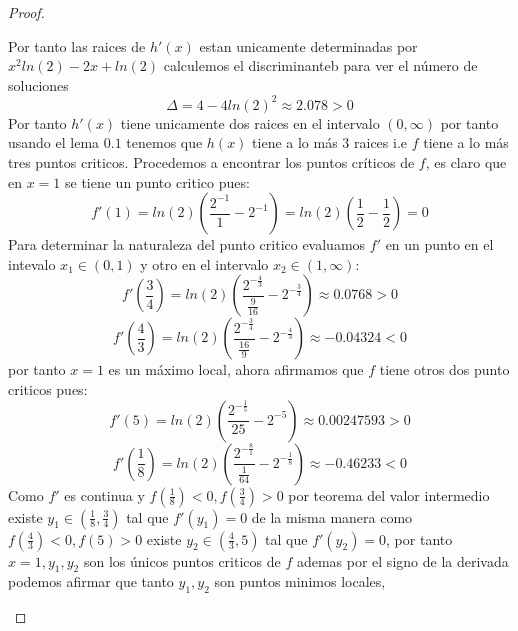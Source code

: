 \documentclass[11pt,letterpaper]{article}
\begin{document}
\begin{proof}
\begin{enumerate}
        Por tanto las raices de $h'(x)$ estan unicamente determinadas por $x^2ln(2)-2x+ln(2)$ calculemos el discriminanteb para ver el n\'umero de soluciones\,\\
        \begin{equation*}
            \Delta=4-4ln(2)^2\approx2.078>0
        \end{equation*}
        Por tanto $h'(x)$ tiene unicamente dos raices en el intervalo $(0,\infty)$ por tanto usando el lema $0.1$ tenemos que $h(x)$ tiene a lo m\'as $3$ raices i.e $f$ tiene a lo m\'as tres puntos criticos.
        Procedemos a encontrar los puntos cr\'iticos de $f$, es claro que en $x=1$ se tiene un punto critico pues:\,\\
        \begin{equation*}
            f'(1)=ln(2)\left(\frac{2^{-1}}{1}-2^{-1}\right)=ln(2)\left(\frac{1}{2}-\frac{1}{2}\right)=0
        \end{equation*}
        Para determinar la naturaleza del punto critico evaluamos $f'$ en un punto en el intevalo $x_1\in(0,1)$ y otro en el intervalo $x_2\in(1,\infty)$:\,\\
        \begin{equation*}
            f'\left(\frac{3}{4}\right)=ln(2)\left(\frac{2^{-\frac{4}{3}}}{\frac{9}{16}}-2^{-\frac{3}{4}}\right)\approx0.0768>0
        \end{equation*}
        \begin{equation*}
            f'\left(\frac{4}{3}\right)=ln(2)\left(\frac{2^{-\frac{3}{4}}}{\frac{16}{9}}-2^{-\frac{4}{3}}\right)\approx-0.04324<0
        \end{equation*}
        por tanto $x=1$ es un m\'aximo local, ahora afirmamos que $f$ tiene otros dos punto criticos pues:
         \begin{equation*}
            f'(5)=ln(2)\left(\frac{2^{-\frac{1}{5}}}{25}-2^{-5}\right)\approx0.00247593>0
        \end{equation*}
        \begin{equation*}
            f'\left(\frac{1}{8}\right)=ln(2)\left(\frac{2^{-\frac{8}{1}}}{\frac{1}{64}}-2^{-\frac{1}{8}}\right)\approx-0.46233<0
        \end{equation*}
        Como $f'$ es continua y $f\left(\frac{1}{8}\right)<0,f\left(\frac{3}{4}\right)>0$ por teorema del valor intermedio existe $y_1\in\left(\frac{1}{8},\frac{3}{4}\right)$ tal que $f'(y_1)=0$ de la misma manera como $f\left(\frac{4}{3}\right)<0,f(5)>0$ existe $y_2\in\left(\frac{4}{3},5\right)$ tal que $f'(y_2)=0$, por tanto $x=1,y_1,y_2$ son los \'unicos puntos criticos de $f$ ademas por el signo de la derivada podemos afirmar que tanto $y_1,y_2$ son puntos minimos locales,

\end{enumerate}
\end{proof}
\end{document}
